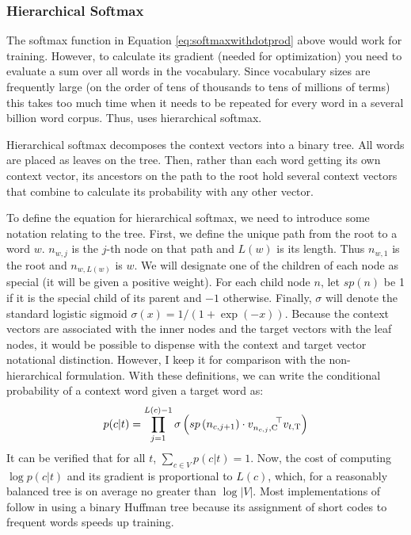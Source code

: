 \subsubsection{Hierarchical Softmax}

The softmax function in Equation \ref{eq:softmaxwithdotprod} above would work 
for training. However, to calculate its 
gradient (needed for optimization) you need to evaluate a sum over all words
in the vocabulary. Since vocabulary sizes are frequently large (on the order of
tens of thousands to tens of millions of terms) this takes too much time when it
needs to be repeated for every word in a several billion word corpus. Thus, 
\modelname{} uses hierarchical softmax.

Hierarchical softmax decomposes the context vectors into a binary tree. All
words are placed as leaves on the tree. Then, rather than each word getting its 
own context vector, its ancestors on the path to the root hold several context
vectors that combine to calculate its probability with any other vector.

To define the equation for hierarchical softmax, we need to introduce some 
notation relating to the tree. First, we define the unique path from the root
to a word $w$. $n_{w,j}$ is the $j$-th node on that path and $L(w)$ is its
length. Thus $n_{w,1}$ is the root and $n_{w,L(w)}$ is $w$. We will designate
one of the children of each node as special (it will be given a positive 
weight). For each child node $n$, let $sp(n)$ be 1 if it is the special child
of its parent and $-1$ otherwise.
Finally, $\sigma$ will denote the standard logistic sigmoid 
$\sigma(x)=1/(1+\exp(-x))$. Because 
the context vectors are associated with the inner nodes and the target vectors 
with the leaf nodes, it would be possible to dispense with the context and 
target vector notational distinction. However, I keep it for 
comparison with the non-hierarchical formulation. With
these definitions, we can write the conditional probability of a context word
given a target word as:
%
\[p(c|t)=\prod_{j=1}^{L(c)-1} \sigma\left(sp\left(n_{c,j+1}\right)
\cdot v_{n_{c,j},\textrm{C}}^{\qquad\top} v_{t,\textrm{T}}\right)\]
%
It can be verified that for all $t$, $\sum_{c\in{}V}p(c|t)=1$. Now, the cost
of computing $\log p(c|t)$ and its gradient is proportional to $L(c)$, which, 
for a reasonably balanced tree is on average no greater than $\log |V|$. Most
implementations of \modelname{} follow \citep{Mikolov2013c} in using a binary
Huffman tree because its assignment of short codes to frequent words speeds
up training.

